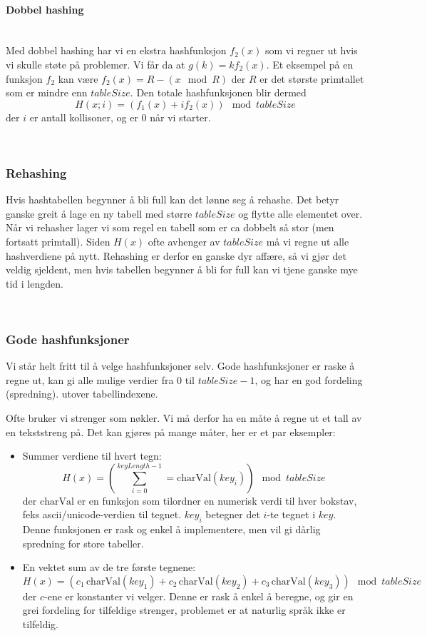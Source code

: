 \paragraph{Dobbel hashing}~\\
Med dobbel hashing har vi en ekstra hashfunksjon $ f_2(x) $ som vi regner ut hvis vi skulle støte på problemer. Vi får da at $ g(k) = k f_2(x) $. Et eksempel på en funksjon $ f_2 $ kan være $ f_2(x) = R-(x \mod R) $ der $ R $ er det største primtallet som er mindre enn $ tableSize $. Den totale hashfunksjonen blir dermed 
\[ H(x;i) = (f_1(x) + if_2(x)) \mod tableSize \]
der $ i $ er antall kollisoner, og er $ 0 $ når vi starter.


~\\
\subsubsection{Rehashing}
Hvis hashtabellen begynner å bli full kan det lønne seg å rehashe. Det betyr ganske greit å lage en ny tabell med større $ tableSize $ og flytte alle elementet over. Når vi rehasher lager vi som regel en tabell som er ca dobbelt så stor (men fortsatt primtall). Siden $ H(x) $ ofte avhenger av $ tableSize $ må vi regne ut alle hashverdiene på nytt. Rehashing er derfor en ganske dyr affære, så vi gjør det veldig sjeldent, men hvis tabellen begynner å bli for full kan vi tjene ganske mye tid i lengden. 

~\\
\subsubsection{Gode hashfunksjoner}
Vi står helt fritt til å velge hashfunksjoner selv. Gode hashfunksjoner er raske å regne ut, kan gi alle mulige verdier fra $ 0 $ til $ tableSize - 1 $, og har en god fordeling (spredning). utover tabellindexene. 

Ofte bruker vi strenger som nøkler. Vi må derfor ha en måte å regne ut et tall av en tekststreng på. Det kan gjøres på mange måter, her er et par eksempler:
\begin{itemize}
\item Summer verdiene til hvert tegn:
\[ H(x) = \left( \sum_{i=0}^{keyLength-1} = \text{charVal}(key_i) \right) \mod{tableSize} \]
der $ \text{charVal} $ er en funksjon som tilordner en numerisk verdi til hver bokstav, feks ascii/unicode-verdien til tegnet. $ key_i $ betegner det $ i $-te tegnet i $ key $. Denne funksjonen er rask og enkel å implementere, men vil gi dårlig spredning for store tabeller. 
\item En vektet sum av de tre første tegnene:
\[ H(x) = \left( c_1\,\text{charVal}(key_1) + c_2\,\text{charVal}(key_2) + c_3\,\text{charVal}(key_3)\right)  \mod{tableSize} \]
der $ c $-ene er konstanter vi velger. Denne er rask å enkel å beregne, og gir en grei fordeling for tilfeldige strenger, problemet er at naturlig språk ikke er tilfeldig.
\end{itemize}


